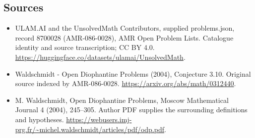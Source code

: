\documentclass[11pt,a4paper]{article}
\begin{document}
\subsection{Sources}
\begin{itemize}
\item[S1] ULAM.AI and the UnsolvedMath Contributors, supplied problems.json, record 8700028 (AMR-086-0028), AMR Open Problem Lists. Catalogue identity and source transcription; CC BY 4.0.
\url{https://huggingface.co/datasets/ulamai/UnsolvedMath}.
\item[S2] Waldschmidt - Open Diophantine Problems (2004), Conjecture 3.10. Original source indexed by AMR-086-0028.
\url{https://arxiv.org/abs/math/0312440}.
\item[S3] M. Waldschmidt, Open Diophantine Problems, Moscow Mathematical Journal 4 (2004), 245–305. Author PDF supplies the surrounding definitions and hypotheses.
\url{https://webusers.imj-prg.fr/~michel.waldschmidt/articles/pdf/odp.pdf}.
\end{itemize}
\end{document}
